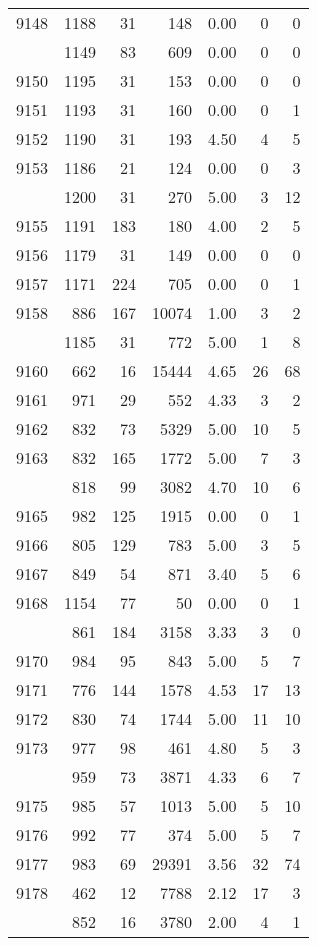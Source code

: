 \documentclass[
]{article}
\begin{document}
\begin{table}
\begin{tabular}[t]{lrrrrrr}
9148 & 1188 & 31 & 148 & 0.00 & 0 & 0\\
\addlinespace
9149 & 1149 & 83 & 609 & 0.00 & 0 & 0\\
9150 & 1195 & 31 & 153 & 0.00 & 0 & 0\\
9151 & 1193 & 31 & 160 & 0.00 & 0 & 1\\
9152 & 1190 & 31 & 193 & 4.50 & 4 & 5\\
9153 & 1186 & 21 & 124 & 0.00 & 0 & 3\\
\addlinespace
9154 & 1200 & 31 & 270 & 5.00 & 3 & 12\\
9155 & 1191 & 183 & 180 & 4.00 & 2 & 5\\
9156 & 1179 & 31 & 149 & 0.00 & 0 & 0\\
9157 & 1171 & 224 & 705 & 0.00 & 0 & 1\\
9158 & 886 & 167 & 10074 & 1.00 & 3 & 2\\
\addlinespace
9159 & 1185 & 31 & 772 & 5.00 & 1 & 8\\
9160 & 662 & 16 & 15444 & 4.65 & 26 & 68\\
9161 & 971 & 29 & 552 & 4.33 & 3 & 2\\
9162 & 832 & 73 & 5329 & 5.00 & 10 & 5\\
9163 & 832 & 165 & 1772 & 5.00 & 7 & 3\\
\addlinespace
9164 & 818 & 99 & 3082 & 4.70 & 10 & 6\\
9165 & 982 & 125 & 1915 & 0.00 & 0 & 1\\
9166 & 805 & 129 & 783 & 5.00 & 3 & 5\\
9167 & 849 & 54 & 871 & 3.40 & 5 & 6\\
9168 & 1154 & 77 & 50 & 0.00 & 0 & 1\\
\addlinespace
9169 & 861 & 184 & 3158 & 3.33 & 3 & 0\\
9170 & 984 & 95 & 843 & 5.00 & 5 & 7\\
9171 & 776 & 144 & 1578 & 4.53 & 17 & 13\\
9172 & 830 & 74 & 1744 & 5.00 & 11 & 10\\
9173 & 977 & 98 & 461 & 4.80 & 5 & 3\\
\addlinespace
9174 & 959 & 73 & 3871 & 4.33 & 6 & 7\\
9175 & 985 & 57 & 1013 & 5.00 & 5 & 10\\
9176 & 992 & 77 & 374 & 5.00 & 5 & 7\\
9177 & 983 & 69 & 29391 & 3.56 & 32 & 74\\
9178 & 462 & 12 & 7788 & 2.12 & 17 & 3\\
\addlinespace
9179 & 852 & 16 & 3780 & 2.00 & 4 & 1\\

\end{tabular}
\end{table}
\end{document}
